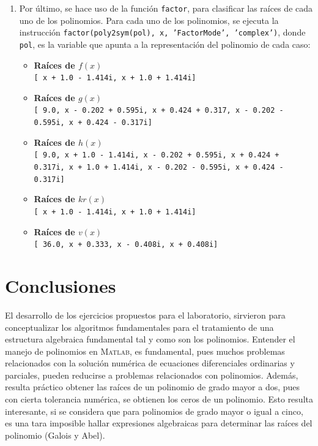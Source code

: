 \documentclass[11pt, spanish]{article}
\begin{document}
\begin{enumerate}
\begin{itemize}
\end{itemize}

\item Por último, se hace uso de la función \texttt{factor}, para clasificar las raíces  de cada uno de los polinomios. Para cada uno de los polinomios, se ejecuta la instrucción \texttt{factor(poly2sym(pol), x, 'FactorMode', 'complex')}, donde \texttt{pol}, es la variable que apunta a la representación del polinomio de cada caso:

\begin{itemize}
\item \textbf{Raíces de $f(x)$} \\

\texttt{[ x + 1.0 - 1.414i, x + 1.0 + 1.414i]}

\item \textbf{Raíces de $g(x)$} \\

\texttt{[ 9.0, x - 0.202 + 0.595i, x + 0.424 + 0.317, x - 0.202 - 0.595i, x + 0.424 - 0.317i]}

\item \textbf{Raíces de $h(x)$} \\

\texttt{[ 9.0, x + 1.0 - 1.414i, x - 0.202 + 0.595i, x + 0.424 + 0.317i, x + 1.0 + 1.414i, x - 0.202 - 0.595i, x + 0.424 - 0.317i]}

\item \textbf{Raíces de $kr(x)$} \\

\texttt{[ x + 1.0 - 1.414i, x + 1.0 + 1.414i]}

\item \textbf{Raíces de $v(x)$} \\

\texttt{[ 36.0, x + 0.333, x - 0.408i, x + 0.408i]}

\end{itemize}

\end{enumerate}
\newpage
\section{Conclusiones}

El desarrollo de los ejercicios propuestos para el laboratorio, sirvieron para conceptualizar los algoritmos fundamentales para el tratamiento de una estructura algebraica fundamental tal y como son los polinomios. Entender el manejo de polinomios en \textsc{Matlab}, es fundamental, pues muchos problemas relacionados con la solución numérica de ecuaciones diferenciales ordinarias y parciales, pueden reducirse a problemas relacionados con polinomios. Además, resulta práctico obtener las raíces de un polinomio de grado mayor a dos, pues con cierta tolerancia numérica, se obtienen los ceros de un polinomio. Esto resulta interesante, si se considera que para polinomios de grado mayor o igual a cinco, es una tara imposible hallar expresiones algebraicas para determinar las raíces del polinomio (Galois y Abel). \\
\end{document}
